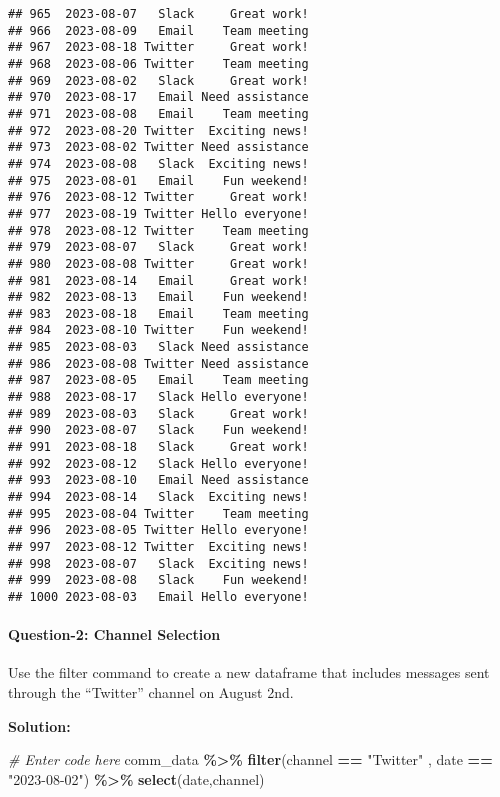 \documentclass[
]{article}
\newenvironment{Shaded}{\begin{snugshade}}{\end{snugshade}}
\newcommand{\CommentTok}[1]{\textcolor[rgb]{0.56,0.35,0.01}{\textit{#1}}}
\newcommand{\FunctionTok}[1]{\textcolor[rgb]{0.13,0.29,0.53}{\textbf{#1}}}
\newcommand{\NormalTok}[1]{#1}
\newcommand{\SpecialCharTok}[1]{\textcolor[rgb]{0.81,0.36,0.00}{\textbf{#1}}}
\newcommand{\StringTok}[1]{\textcolor[rgb]{0.31,0.60,0.02}{#1}}
\begin{document}
\begin{verbatim}
## 965  2023-08-07   Slack     Great work!
## 966  2023-08-09   Email    Team meeting
## 967  2023-08-18 Twitter     Great work!
## 968  2023-08-06 Twitter    Team meeting
## 969  2023-08-02   Slack     Great work!
## 970  2023-08-17   Email Need assistance
## 971  2023-08-08   Email    Team meeting
## 972  2023-08-20 Twitter  Exciting news!
## 973  2023-08-02 Twitter Need assistance
## 974  2023-08-08   Slack  Exciting news!
## 975  2023-08-01   Email    Fun weekend!
## 976  2023-08-12 Twitter     Great work!
## 977  2023-08-19 Twitter Hello everyone!
## 978  2023-08-12 Twitter    Team meeting
## 979  2023-08-07   Slack     Great work!
## 980  2023-08-08 Twitter     Great work!
## 981  2023-08-14   Email     Great work!
## 982  2023-08-13   Email    Fun weekend!
## 983  2023-08-18   Email    Team meeting
## 984  2023-08-10 Twitter    Fun weekend!
## 985  2023-08-03   Slack Need assistance
## 986  2023-08-08 Twitter Need assistance
## 987  2023-08-05   Email    Team meeting
## 988  2023-08-17   Slack Hello everyone!
## 989  2023-08-03   Slack     Great work!
## 990  2023-08-07   Slack    Fun weekend!
## 991  2023-08-18   Slack     Great work!
## 992  2023-08-12   Slack Hello everyone!
## 993  2023-08-10   Email Need assistance
## 994  2023-08-14   Slack  Exciting news!
## 995  2023-08-04 Twitter    Team meeting
## 996  2023-08-05 Twitter Hello everyone!
## 997  2023-08-12 Twitter  Exciting news!
## 998  2023-08-07   Slack  Exciting news!
## 999  2023-08-08   Slack    Fun weekend!
## 1000 2023-08-03   Email Hello everyone!
\end{verbatim}

\hypertarget{question-2-channel-selection}{%
\paragraph{Question-2: Channel
Selection}\label{question-2-channel-selection}}

Use the filter command to create a new dataframe that includes messages
sent through the ``Twitter'' channel on August 2nd.

\textbf{Solution:}

\begin{Shaded}
\begin{Highlighting}[]
\CommentTok{\# Enter code here}
\NormalTok{comm\_data }\SpecialCharTok{\%\textgreater{}\%} 
  \FunctionTok{filter}\NormalTok{(channel }\SpecialCharTok{==} \StringTok{"Twitter"}\NormalTok{ , date }\SpecialCharTok{==} \StringTok{"2023{-}08{-}02"}\NormalTok{) }\SpecialCharTok{\%\textgreater{}\%}
  \FunctionTok{select}\NormalTok{(date,channel)}
\end{Highlighting}
\end{Shaded}
\end{document}

